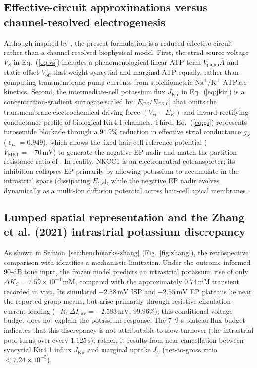 \documentclass[final,5p,times]{elsarticle}
\begin{document}
\subsection{Effective-circuit approximations versus channel-resolved electrogenesis}\label{sec:limitations-circuit}

Although inspired by \citet{Nin2008,Nin2012}, the present formulation is a reduced effective circuit rather than a channel-resolved biophysical model. First, the strial source voltage \(V_S\) in Eq.~(\ref{eq:vs}) includes a phenomenological linear ATP term \(V_{\mathrm{pump}}\bar{A}\) and static offset \(V_{\mathrm{off}}\) that weight syncytial and marginal ATP equally, rather than computing transmembrane pump currents from stoichiometric \(\mathrm{Na}^+/\mathrm{K}^+\)-ATPase kinetics. Second, the intermediate-cell potassium flux \(J_{\mathrm{Kir}}\) in Eq.~(\ref{eq:jkir}) is a concentration-gradient surrogate scaled by \(|E_{CS}/E_{CS,0}|\) that omits the transmembrane electrochemical driving force \((V_m - E_K)\) and inward-rectifying conductance profile of biological Kir4.1 channels. Third, Eq.~(\ref{eq:gs}) represents furosemide blockade through a \(94.9\%\) reduction in effective strial conductance \(g_S\) (\(\ell_D = 0.949\)), which allows the fixed hair-cell reference potential (\(V_{\mathrm{MET}} = -70\,\mathrm{mV}\)) to generate the negative EP nadir and match the partition resistance ratio of \citet{AsakumaSnow1980}. In reality, NKCC1 is an electroneutral cotransporter; its inhibition collapses EP primarily by allowing potassium to accumulate in the intrastrial space (dissipating \(E_{CS}\)), while the negative EP nadir evolves dynamically as a multi-ion diffusion potential across hair-cell apical membranes \citep{Bosher1979,AsakumaSnow1980,Nin2008}.

\subsection{Lumped spatial representation and the Zhang et al. (2021) intrastrial potassium discrepancy}\label{sec:limitations-zhang}

As shown in Section~\ref{sec:benchmarks-zhang} (Fig.~\ref{fig:zhang}), the retrospective comparison with \citet{Zhang2021} identifies a mechanistic limitation. Under the outcome-informed 90-dB tone input, the frozen model predicts an intrastrial potassium rise of only \(\Delta K_S=7.59\times10^{-4}\,\mathrm{mM}\), compared with the approximately \(0.74\,\mathrm{mM}\) transient recorded in vivo. Its simulated \(-2.58\,\mathrm{mV}\) ISP and \(-2.55\,\mathrm{mV}\) EP plateaus lie near the reported group means, but arise primarily through resistive circulation-current loading (\(-R_C\Delta I_{\mathrm{circ}}=-2.583\,\mathrm{mV}\), \(99.96\%\)); this conditional voltage budget does not explain the potassium response. The 7--9-s plateau flux budget indicates that this discrepancy is not attributable to slow turnover (the intrastrial pool turns over every \(1.125\,\mathrm{s}\)); rather, it results from near-cancellation between syncytial Kir4.1 influx \(J_{\mathrm{Kir}}\) and marginal uptake \(J_U\) (net-to-gross ratio \(<7.24\times10^{-5}\)).
\end{document}
